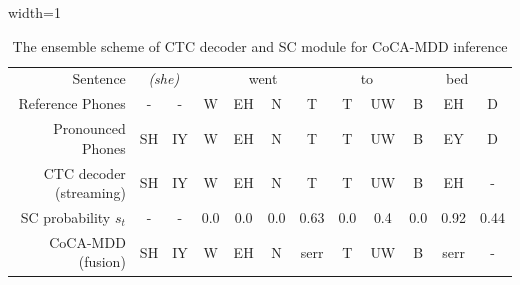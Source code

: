 \documentclass[a4paper]{article}
\begin{document}
\begin{table}[!t]
\centering
\caption{
The ensemble scheme of CTC decoder and SC module for CoCA-MDD inference
}
\setlength{\tabcolsep}{3pt}
\begin{adjustbox}{width=1\linewidth}
\begin{tabular}{r|cc|cccc|cc|ccc}
\hline
Sentence           & \multicolumn{2}{c|}{\textit{(she)}} & \multicolumn{4}{c|}{went} & \multicolumn{2}{c|}{to} & \multicolumn{3}{c}{bed} \\
Reference Phones                  & -             & -          & W           & EH   & N    & T         & T         & UW          & B        & EH    & D          \\
Pronounced Phones              & SH          & IY         & W           & EH   & N    & T         & T         & UW          & B        & EY     & D          \\ \hline
CTC decoder (streaming)       & SH          & IY         & W           & EH   & N     & T        & T         & UW          & B        & EH    & -         \\ 
SC  probability $s_t$              & -             & -          & 0.0          & 0.0   & 0.0  & 0.63     & 0.0      & 0.4           & 0.0      & 0.92   & 0.44       \\ 
CoCA-MDD (fusion)              & SH          & IY         & W           & EH   &  N   & serr        & T        & UW          & B        & serr     & -          \\ \hline
\end{tabular}
\end{adjustbox}
\label{tab:ensem}
\end{table}
\end{document}
